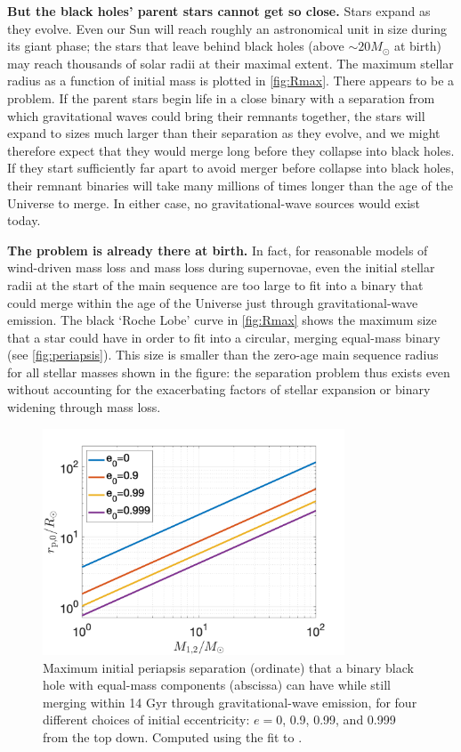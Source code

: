 \documentclass[review]{elsarticle}
\begin{document}
\textbf{But the black holes' parent stars cannot get so close.} Stars expand as they evolve. Even our Sun will reach roughly an astronomical unit in size during its giant phase; the stars that leave behind black holes (above $\sim 20 M_\odot$  at birth) may reach thousands of solar radii at their maximal extent. The maximum stellar radius as a function of initial mass is plotted in \autoref{fig:Rmax}. There appears to be a problem. If the parent stars begin life in a close binary with a separation from which gravitational waves could bring their remnants together, the stars will expand to sizes much larger than their separation as they evolve, and we might therefore expect that they would merge long before they collapse into black holes. If they start sufficiently far apart to avoid merger before collapse into black holes, their remnant binaries will take many millions of times longer than the age of the Universe to merge. In either case, no gravitational-wave sources would exist today. 

\textbf{The problem is already there at birth.} In fact, for reasonable models of wind-driven mass loss and mass loss during supernovae, even the initial stellar radii at the start of the main sequence are too large to fit into a binary that could merge within the age of the Universe just through gravitational-wave emission.  The black `Roche Lobe' curve in \autoref{fig:Rmax} shows the maximum size that a star could have in order to fit into a circular, merging equal-mass binary (see \autoref{fig:periapsis}).  This size is smaller than the zero-age main sequence radius for all stellar masses shown in the figure: the separation problem thus exists even without accounting for the exacerbating factors of stellar expansion or binary widening through mass loss.


\begin{figure}
	\centering
	\includegraphics[width=0.8\textwidth]{M-rp-log.png}
	\caption{Maximum initial periapsis separation (ordinate) that a binary black hole with equal-mass components (abscissa) can have while still merging within 14 Gyr through gravitational-wave emission, for four different choices of initial eccentricity: $e=0$, 0.9, 0.99, and 0.999 from the top down.  Computed using the \citet{Mandel:2021} fit to \citet{Peters:1964}. \label{fig:periapsis}}
\end{figure}
	
\end{document}
